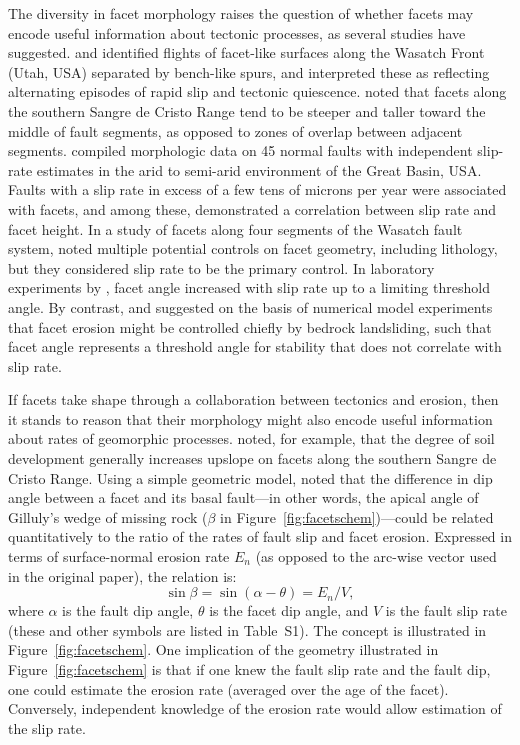 The diversity in facet morphology raises the question of whether facets may encode useful information about tectonic processes, as several studies have suggested. \citet{hamblin1976patterns} and \citet{anderson1977compound} identified flights of facet-like surfaces along the Wasatch Front (Utah, USA) separated by bench-like spurs, and interpreted these as reflecting alternating episodes of rapid slip and tectonic quiescence. \citet{menges1990soils} noted that facets along the southern Sangre de Cristo Range tend to be steeper and taller toward the middle of fault segments, as opposed to zones of overlap between adjacent segments. \citet{depolo2000estimating} compiled morphologic data on 45 normal faults with independent slip-rate estimates in the arid to semi-arid environment of the Great Basin, USA. Faults with a slip rate in excess of a few tens of microns per year were associated with facets, and among these, \citet{depolo2000estimating} demonstrated a correlation between slip rate and facet height. In a study of facets along four segments of the Wasatch fault system, \citet{zuchiewicz2000geometry} noted multiple potential controls on facet geometry, including lithology, but they considered slip rate to be the primary control. In laboratory experiments by \citet{strak2011interaction}, facet angle increased with slip rate up to a limiting threshold angle. By contrast, \citet{densmore1998landsliding} and \citet{ellis1999development} suggested on the basis of numerical model experiments that facet erosion might be controlled chiefly by bedrock landsliding, such that facet angle represents a threshold angle for stability that does not correlate with slip rate.

If facets take shape through a collaboration between tectonics and erosion, then it stands to reason that their morphology might also encode useful information about rates of geomorphic processes. \citet{menges1990soils} noted, for example, that the degree of soil development generally increases upslope on facets along the southern Sangre de Cristo Range. Using a simple geometric model, \citet{tucker2011geomorphic} noted that the difference in dip angle between a facet and its basal fault---in other words, the apical angle of Gilluly's wedge of missing rock ($\beta$ in Figure~\ref{fig:facetschem})---could be related quantitatively to the ratio of the rates of fault slip and facet erosion. Expressed in terms of surface-normal erosion rate $E_n$ (as opposed to the arc-wise vector used in the original paper), the relation is:
\begin{equation}
\sin \beta = \sin ( \alpha - \theta ) = E_n / V,
\label{eq:predangle}
\end{equation}
where $\alpha$ is the fault dip angle, $\theta$ is the facet dip angle, and $V$ is the fault slip rate (these and other symbols are listed in Table~S1). The concept is illustrated in Figure~\ref{fig:facetschem}. One implication of the geometry illustrated in Figure~\ref{fig:facetschem} is that if one knew the fault slip rate and the fault dip, one could estimate the erosion rate (averaged over the age of the facet). Conversely, independent knowledge of the erosion rate would allow estimation of the slip rate.

